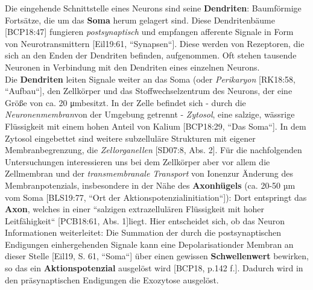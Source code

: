 Die eingehende Schnittstelle eines Neurons sind seine \textbf{Dendriten}: Baumförmige Fortsätze\footnotemark[9], die um das \textbf{Soma} herum gelagert sind. Diese Dendritenbäume [BCP18:47] fungieren \textit{postsynaptisch} und empfangen afferente Signale in Form von Neurotransmittern [Eil19:61, ``Synapsen``]. Diese werden von Rezeptoren, die sich an den Enden der Dendriten befinden, aufgenommen. Oft stehen tausende Neuronen in Verbindung mit den Dendriten eines einzelnen Neurons\footnotemark[10] [SD07, S .42].\\


Die \textbf{Dendriten} leiten Signale weiter an das Soma (oder \textit{Perikaryon} [RK18:58, ``Aufbau``], den Zellkörper und das Stoffwechselzentrum des Neurons, der eine Größe von ca. 20 μm\footnotemark[11] [BCP18:29] besitzt. In der Zelle befindet sich - durch die \textit{Neuronenmembran}\footnotemark[12] von der Umgebung getrennt - \textit{Zytosol}, eine salzige, wässrige Flüssigkeit mit einem hohen Anteil von Kalium [BCP18:29, ``Das Soma``]\footnotemark[13]. In dem Zytosol eingebettet sind weitere subzelluläre Strukturen mit eigener Membranbegrenzung, die \textit{Zellorganellen} [SD07:8, Abs. 2]. Für die nachfolgenden Untersuchungen interessieren uns bei dem Zellkörper aber vor allem die Zellmembran und der \textit{transmembranale Transport} von Ionen\footnotemark[14] zur Änderung des Membranpotenzials, insbesondere in der Nähe des \textbf{Axonhügels} (ca. 20-50 µm vom Soma [BLS19:77, ``Ort der Aktionspotenzialinitiation``]): Dort entspringt das \textbf{Axon}, welches in einer ``salzigen extrazellulären Flüssigkeit mit hoher Leitfähigkeit`` [PCB18:61, Abs. 1]\footnotemark[15] liegt. Hier entscheidet sich, ob das Neuron Informationen weiterleitet: Die Summation der durch die postsynaptischen Endigungen einhergehenden Signale kann eine Depolarisation\footnotemark[16] der Membran an dieser Stelle [Eil19, S. 61, ``Soma``] über einen gewissen \textbf{Schwellenwert} bewirken, so das ein \textbf{Aktionspotenzial} ausgelöst wird [BCP18, p.142 f.]. Dadurch wird in den präsynaptischen Endigungen die Exozytose ausgelöst.


